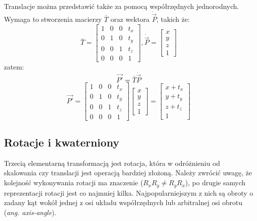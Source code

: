 \documentclass[licencjacka]{pracamgr}
\begin{document}
Translacje można przedstawić także za pomocą współrzędnych jednorodnych. Wymaga to stworzenia macierzy $\bar{T}$ oraz wektora $\dot{\vec{P}}$, takich że:
$$
\bar{T}
=
\begin{bmatrix}
1 & 0 & 0 & t_x \\
0 & 1 & 0 & t_y \\
0 & 0 & 1 & t_z \\
0 & 0 & 0 & 1
\end{bmatrix}
,
\dot{\vec{P}}
=
\begin{bmatrix}
x \\
y \\
z \\
1
\end{bmatrix}
$$
zatem:
$$
\vec{P'}=\bar{T} \dot{\vec{P}}
$$
$$
\vec{P'}=
\begin{bmatrix}
1 & 0 & 0 & t_x \\
0 & 1 & 0 & t_y \\
0 & 0 & 1 & t_z \\
0 & 0 & 0 & 1
\end{bmatrix}
\begin{bmatrix}
x \\
y \\
z \\
1
\end{bmatrix}
=
\begin{bmatrix}
x+t_x \\
y+t_y \\
z+t_z \\
1
\end{bmatrix}
$$
\subsection{Rotacje i kwaterniony}
Trzecią elementarną transformacją jest rotacja, która w odróżnieniu od skalowania czy translacji jest operacją bardziej złożoną. Należy zwrócić uwagę, że kolejność wykonywania rotacji ma znaczenie ($R_xR_y\neq R_yR_x$), po drugie samych reprezentacji rotacji jest co najmniej kilka. Najpopularniejszym z nich są obroty o zadany kąt wokół jednej z osi układu współrzędnych lub arbitralnej osi obrotu (\textit{ang. axis-angle}).
\end{document}
